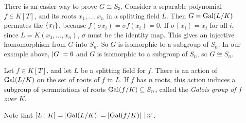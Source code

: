 There is an easier way to prove \( G \cong S_3 \).
Consider a separable polynomial \( f \in K[T] \), and its roots \( x_1, \dots, x_n \) in a splitting field \( L \).
Then \( G = \operatorname{Gal}(L / K) \) permutes the \( \qty{x_i} \), because \( f(\sigma x_i) = \sigma f(x_i) = 0 \).
If \( \sigma(x_i) = x_i \) for all \( i \), since \( L = K(x_1, \dots, x_n) \), \( \sigma \) must be the identity map.
This gives an injective homomorphism from \( G \) into \( S_n \).
So \( G \) is isomorphic to a subgroup of \( S_n \).
In our example above, \( \abs{G} = 6 \) and \( G \) is isomorphic to a subgroup of \( S_n \), so \( G \cong S_n \).
\begin{definition}
	Let \( f \in K[T] \), and let \( L \) be a splitting field for \( f \).
	There is an action of \( \operatorname{Gal}(L/K) \) on the set of roots of \( f \) in \( L \).
	If \( f \) has \( n \) roots, this action induces a subgroup of permutations of roots \( \operatorname{Gal}(f/K) \subseteq S_n \), called the \emph{Galois group of \( f \) over \( K \)}.
\end{definition}
\begin{remark}
	Note that \( [L : K] = \abs{\operatorname{Gal}(L/K)} = \abs{\operatorname{Gal}(f/K)} \mid n! \).
\end{remark}

